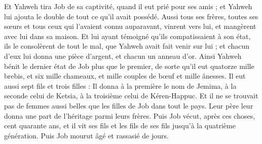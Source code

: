 \begin{multicols}{2}
Et Yahweh tira Job de sa captivité, quand il eut prié pour ses amis ; et Yahweh lui ajouta le double de tout ce qu'il avait possédé.
Aussi tous ses frères, toutes ses sœurs et tous ceux qui l'avaient connu auparavant, vinrent vers lui, et mangèrent avec lui dans sa maison. Et lui ayant témoigné qu'ils compatissaient à son état, ils le consolèrent de tout le mal, que Yahweh avait fait venir sur lui ; et chacun d'eux lui donna une pièce d'argent, et chacun un anneau d'or.
Ainsi Yahweh bénit le dernier état de Job plus que le premier, de sorte qu'il eut quatorze mille brebis, et six mille chameaux, et mille couples de bœuf et mille ânesses.
Il eut aussi sept fils et trois filles :
Il donna à la première le nom de Jemima, à la seconde celui de Ketsia, à la troisième celui de Kéren-Happuc.
Et il ne se trouvait pas de femmes aussi belles que les filles de Job dans tout le pays. Leur père leur donna une part de l'héritage parmi leurs frères.
Puis Job vécut, après ces choses, cent quarante ans, et il vit ses fils et les fils de ses fils jusqu'à la quatrième génération.
Puis Job mourut âgé et rassasié de jours.
\PPE{}
\end{multicols}
